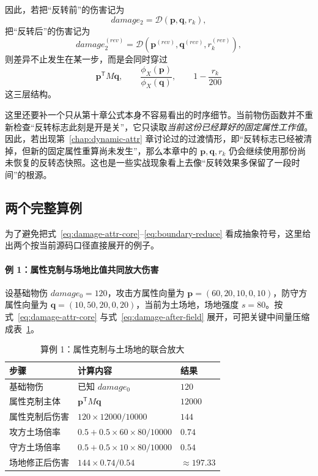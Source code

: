 因此，若把“反转前”的伤害记为
\begin{equation}
    damage_2 = \mathcal{D}(\bm{p},\bm{q},r_k),
\end{equation}
把“反转后”的伤害记为
\begin{equation}
    damage_2^{(rev)} = \mathcal{D}(\bm{p}^{(rev)},\bm{q}^{(rev)},r_k^{(rev)}),
\end{equation}
则差异不止发生在某一步，而是会同时穿过
\begin{equation}
    \bm{p}^{\mathsf T}M\bm{q},
    \qquad
    \frac{\phi_X(\bm{p})}{\phi_X(\bm{q})},
    \qquad
    1-\frac{r_k}{200}
\end{equation}
这三层结构。

这里还要补一个只从第十章公式本身不容易看出的时序细节。当前物伤函数并不重新检查“反转标志此刻是开是关”，它只读取\emph{当前这份已经算好的固定属性工作值}。因此，若出现第~\ref{chap:dynamic-attr} 章讨论过的过渡情形，即“反转标志已经被清掉，但新的固定属性重算尚未发生”，那么本章中的 $\bm{p},\bm{q},r_k$ 仍会继续使用那份尚未恢复的反转态快照。这也是一些实战现象看上去像“反转效果多保留了一段时间”的根源。

\subsection{两个完整算例}

为了避免把式~\eqref{eq:damage-attr-core}--\eqref{eq:boundary-reduce} 看成抽象符号，这里给出两个按当前源码口径直接展开的例子。

\paragraph{例 1：属性克制与场地比值共同放大伤害}
设基础物伤 $damage_0=120$，攻击方属性向量为 $\bm{p}=(60,20,10,0,10)$，防守方属性向量为 $\bm{q}=(10,50,20,0,20)$，当前为土场地，场地强度 $s=80$。按式~\eqref{eq:damage-attr-core} 与式~\eqref{eq:damage-after-field} 展开，可把关键中间量压缩成表~\ref{tab:damage-example-field}。

\begin{table}[H]
    \centering
    \caption{算例 1：属性克制与土场地的联合放大}
    \label{tab:damage-example-field}
    \begin{tabularx}{\textwidth}{>{\raggedright\arraybackslash}p{3.0cm} X >{\raggedleft\arraybackslash}p{2.7cm}}
        \toprule
        步骤 & 计算内容 & 结果 \\
        \midrule
        基础物伤 & 已知 $damage_0$ & $120$ \\
        属性克制主体 & $\bm{p}^{\mathsf T}M\bm{q}$ & $12000$ \\
        属性克制后伤害 & $120\times 12000/10000$ & $144$ \\
        攻方土场倍率 & $0.5+0.5\times 60\times 80/10000$ & $0.74$ \\
        守方土场倍率 & $0.5+0.5\times 10\times 80/10000$ & $0.54$ \\
        场地修正后伤害 & $144\times 0.74/0.54$ & $\approx 197.33$ \\
        \bottomrule
    \end{tabularx}
\end{table}

